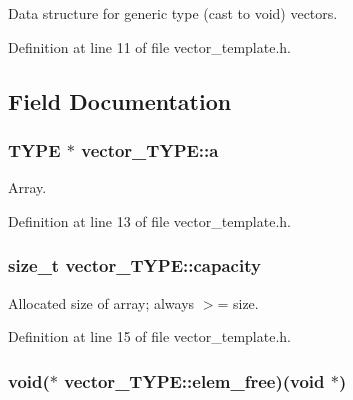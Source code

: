 Data structure for generic type (cast to void) vectors.

Definition at line 11 of file vector\-\_\-template.\-h.



\subsection{Field Documentation}
\hypertarget{structvector___t_y_p_e_a4462761169011ea7e4085eef5a3f2d12}{
\subsubsection[{a}]{\setlength{\rightskip}{0pt plus 5cm}T\-Y\-P\-E $\ast$ vector\-\_\-\-T\-Y\-P\-E\-::a}}\label{structvector___t_y_p_e_a4462761169011ea7e4085eef5a3f2d12}


Array. 



Definition at line 13 of file vector\-\_\-template.\-h.

\hypertarget{structvector___t_y_p_e_aa2f337cea7d3cb1e1ed4f5ee5a22678f}{
\subsubsection[{capacity}]{\setlength{\rightskip}{0pt plus 5cm}size\-\_\-t vector\-\_\-\-T\-Y\-P\-E\-::capacity}}\label{structvector___t_y_p_e_aa2f337cea7d3cb1e1ed4f5ee5a22678f}


Allocated size of array; always $>$= size. 



Definition at line 15 of file vector\-\_\-template.\-h.

\hypertarget{structvector___t_y_p_e_a0ebd337f312279fe2fb82e7a879f6456}{
\subsubsection[{elem\-\_\-free}]{\setlength{\rightskip}{0pt plus 5cm}void($\ast$ vector\-\_\-\-T\-Y\-P\-E\-::elem\-\_\-free)(void $\ast$)}}\label{structvector___t_y_p_e_a0ebd337f312279fe2fb82e7a879f6456}


